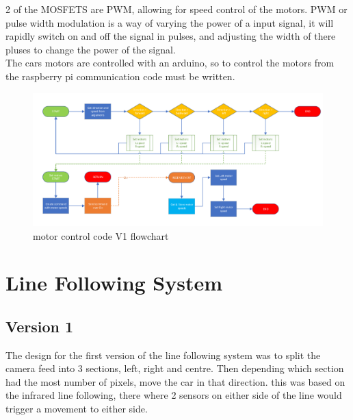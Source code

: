 2 of the MOSFETS are PWM, allowing for speed control of the motors. PWM or pulse width modulation is a way of varying the power of a input signal, it will rapidly switch on and off the signal in pulses, and adjusting the width of there pluses to change the power of the signal.\\
The cars motors are controlled with an arduino, so to control the motors from the raspberry pi communication code must be written.

\begin{figure}[h]%
	\centering
	\includegraphics[width = 1\textwidth]{"assets/control_V1_flowchart"}
	\caption{motor control code V1 flowchart}
	\label{fig:control_V1_flowchart}
\end{figure}

		\chapter{Line Following System}
		
	\section{Version 1}

The design for the first version of the line following system was to split the camera feed into 3 sections, left, right and centre. Then depending which section had the most number of pixels, move the car in that direction. this was based on the infrared line following, there where 2 sensors on either side of the line would trigger a movement to either side.   

